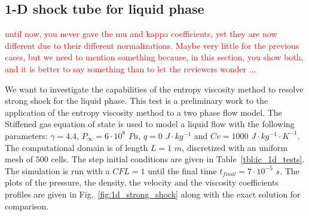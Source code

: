 \documentclass[preprint,10pt]{elsarticle}
\newcommand{\fig}[1]{Fig.~\ref{#1}}                      %
\newcommand{\tbl}[1]{Table~\ref{#1}}                     %
\newcommand{\tcr}[1]{\textcolor{red}{#1}}
\begin{document}
\subsection{1-D shock tube for liquid phase} \label{sec:liquid_shock}
\tcr{until now, you never gave the mu and kappa coefficients, yet they are now different due to their different normalizations.
Maybe very little for the previous cases, but we need to mention something because, in this section, you show both, and it is better
to say something than to let the reviewers wonder ... }


We want to investigate the capabilities of the entropy viscosity method to resolve strong shock for the liquid phase. This test is a preliminary work to the application of the entropy viscosity method to a two phase flow model. The Stiffened gas equation of state is used to model a liquid flow with the following parameters: $\gamma = 4.4$, $P_\infty = 6 \cdot 10^8$ $Pa$, $q = 0$ $J \cdot kg^{-1}$ and $Cv = 1000$ $J \cdot kg^{-1} \cdot K^{-1}$. The computational domain is of length $L=1$ $m$, discretized with an uniform mesh of $500$ cells. The step initial conditions are given in \tbl{tbl:ic_1d_tests}.
%
The simulation is run with a $CFL=1$ until the final time $t_{final} = 7 \cdot 10^{-5}$ $s$. The plots of the pressure, the density, the velocity and the viscosity coefficients profiles are given in \fig{fig:1d_strong_shock} along with the exact solution for comparison.
%
\end{document}
